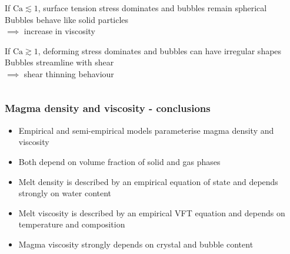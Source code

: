 \documentclass{beamer}
\begin{document}
\begin{frame}
\begin{columns}[t]
\begin{column}{0.5\textwidth}
      \vspace{0.5cm}
      
      If $\text{Ca} \lesssim 1$, surface tension stress dominates and bubbles remain spherical \\
      \hspace*{0.5cm} Bubbles behave like solid particles \\
      \hspace*{1cm} $\implies$ increase in viscosity \\

      \vspace{0.5cm}
      
      If $\text{Ca} \gtrsim 1$, deforming stress dominates and bubbles can have irregular shapes \\
      \hspace*{0.5cm} Bubbles streamline with shear \\
      \hspace*{1cm} $\implies$ shear thinning behaviour \\

    \end{column}
    
  \end{columns}

\end{frame}
\begin{frame}
  \frametitle{Magma density and viscosity - conclusions}

  \begin{itemize}
  \item Empirical and semi-empirical models parameterise magma density and viscosity \\
    \vspace{0.5cm}
  \item Both depend on volume fraction of solid and gas phases \\
    \vspace{0.5cm}
  \item Melt density is described by an empirical equation of state and depends strongly on water content \\
    \vspace{0.5cm}
  \item Melt viscosity is described by an empirical VFT equation and depends on temperature and composition \\
    \vspace{0.5cm}
  \item Magma viscosity strongly depends on crystal and bubble content \\
  \end{itemize}
\end{frame}
\end{document}
